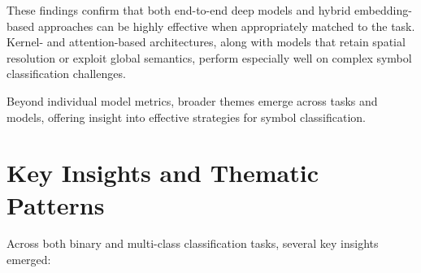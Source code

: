 These findings confirm that both end-to-end deep models and hybrid embedding-based approaches can be highly
effective when appropriately matched to the task. Kernel- and attention-based architectures, along with models that
retain spatial resolution or exploit global semantics, perform especially well on complex symbol classification
challenges.

Beyond individual model metrics, broader themes emerge across tasks and models, offering insight into effective
strategies for symbol classification.

\section{Key Insights and Thematic Patterns}
\label{subsec:key-insights}

Across both binary and multi-class classification tasks, several key insights emerged:

